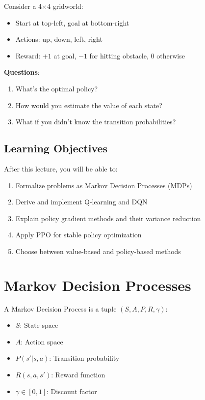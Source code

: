 Consider a 4×4 gridworld:
\begin{itemize}
    \item Start at top-left, goal at bottom-right
    \item Actions: up, down, left, right
    \item Reward: $+1$ at goal, $-1$ for hitting obstacle, $0$ otherwise
\end{itemize}

\textbf{Questions}:
\begin{enumerate}
    \item What's the optimal policy?
    \item How would you estimate the value of each state?
    \item What if you didn't know the transition probabilities?
\end{enumerate}

\subsection{Learning Objectives}

After this lecture, you will be able to:
\begin{enumerate}
    \item Formalize problems as Markov Decision Processes (MDPs)
    \item Derive and implement Q-learning and DQN
    \item Explain policy gradient methods and their variance reduction
    \item Apply PPO for stable policy optimization
    \item Choose between value-based and policy-based methods
\end{enumerate}


\section{Markov Decision Processes}


\begin{definition}[MDP]
A Markov Decision Process is a tuple $(S, A, P, R, \gamma)$:
\begin{itemize}
    \item $S$: State space
    \item $A$: Action space
    \item $P(s'|s,a)$: Transition probability
    \item $R(s,a,s')$: Reward function
    \item $\gamma \in [0,1]$: Discount factor
\end{itemize}
\end{definition}

